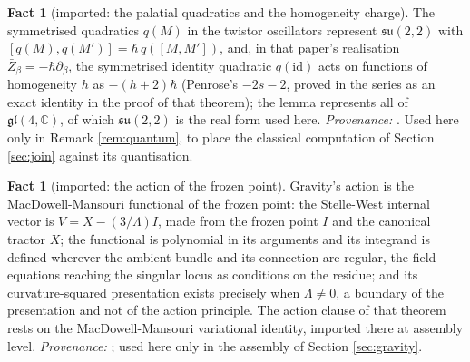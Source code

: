 \documentclass[11pt]{article}
\theoremstyle{definition}
\newtheorem{fact}[theorem]{Fact}
\newcommand{\C}{\mathbb{C}}
\begin{document}
\begin{fact}[imported: the palatial quadratics and the homogeneity charge]\label{fact:palatial}
The symmetrised quadratics $q(M)$ in the twistor oscillators represent $\mathfrak{su}(2,2)$ with $[q(M), q(M')] = \hbar\, q([M,M'])$, and, in that paper's realisation $\bar{Z}_{\beta} = -\hbar\partial_{\beta}$, the symmetrised identity quadratic $q(\mathrm{id})$ acts on functions of homogeneity $h$ as $-(h+2)\hbar$ (Penrose's $-2s-2$, proved in the series as an exact identity in the proof of that theorem); the lemma represents all of $\mathfrak{gl}(4,\C)$, of which $\mathfrak{su}(2,2)$ is the real form used here. \emph{Provenance:} \cite[Lem.~5.5, Thm.~5.7]{ButlerT9}. Used here only in Remark \ref{rem:quantum}, to place the classical computation of Section \ref{sec:join} against its quantisation.
\end{fact}

\begin{fact}[imported: the action of the frozen point]\label{fact:action}
Gravity's action is the MacDowell-Mansouri functional of the frozen point: the Stelle-West internal vector is $V = X - (3/\Lambda)I$, made from the frozen point $I$ and the canonical tractor $X$; the functional is polynomial in its arguments and its integrand is defined wherever the ambient bundle and its connection are regular, the field equations reaching the singular locus as conditions on the residue; and its curvature-squared presentation exists precisely when $\Lambda \neq 0$, a boundary of the presentation and not of the action principle. The action clause of that theorem rests on the MacDowell-Mansouri variational identity, imported there at assembly level. \emph{Provenance:} \cite[Thm.~3.1]{ButlerT10}; used here only in the assembly of Section \ref{sec:gravity}.
\end{fact}
\end{document}
